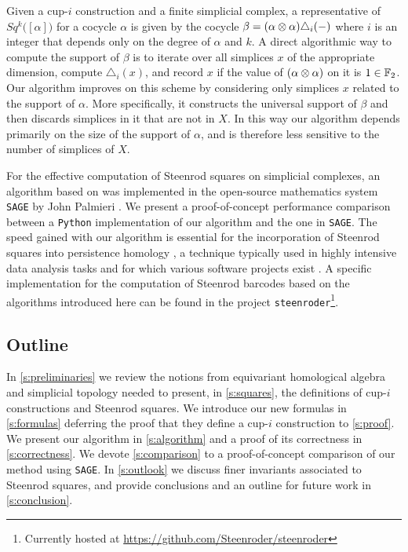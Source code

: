 Given a cup-$i$ construction and a finite simplicial complex, a representative of $Sq^k \big( [\alpha] \big)$ for a cocycle $\alpha$ is given by the cocycle $\beta = (\alpha \otimes \alpha) \triangle_{i}(-)$ where $i$ is an integer that depends only on the degree of $\alpha$ and $k$.
A direct algorithmic way to compute the support of $\beta$ is to iterate over all simplices $x$ of the appropriate dimension, compute $\triangle_i(x)$, and record $x$ if the value of $(\alpha \otimes \alpha)$ on it is $1 \in {\mathbb{F}_2}$.
Our algorithm improves on this scheme by considering only simplices $x$ related to the support of $\alpha$.
More specifically, it constructs the universal support of $\beta$ and then discards simplices in it that are not in $X$.
In this way our algorithm depends primarily on the size of the support of $\alpha$, and is therefore less sensitive to the number of simplices of $X$.

For the effective computation of Steenrod squares on simplicial complexes, an algorithm based on \cite{gonzalez-diaz1999steenrod} was implemented in the open-source mathematics system \verb|SAGE| by John Palmieri \cite{sagemath}.
We present a proof-of-concept performance comparison between a \verb|Python| implementation of our algorithm and the one in \verb|SAGE|.
The speed gained with our algorithm is essential for the incorporation of Steenrod squares into persistence homology \cite{medina2021per_st}, a technique typically used in highly intensive data analysis tasks \cite{carlsson2008images, chan2013viral, lee2017quantifying} and for which various software projects exist \cite{bauer2021ripser, gudhi, medina2021giotto}.
A specific implementation for the computation of Steenrod barcodes based on the algorithms introduced here can be found in the project \texttt{steenroder}\footnote{Currently hosted at \url{https://github.com/Steenroder/steenroder}}.

\subsection*{Outline}

In \cref{s:preliminaries} we review the notions from equivariant homological algebra and simplicial topology needed to present, in \cref{s:squares}, the definitions of cup-$i$ constructions and Steenrod squares.
We introduce our new formulas in \cref{s:formulas} deferring the proof that they define a cup-$i$ construction to \cref{s:proof}.
We present our algorithm in \cref{s:algorithm} and a proof of its correctness in \cref{s:correctness}.
We devote \cref{s:comparison} to a proof-of-concept comparison of our method using \verb|SAGE|.
In \cref{s:outlook} we discuss finer invariants associated to Steenrod squares, and provide conclusions and an outline for future work in \cref{s:conclusion}.